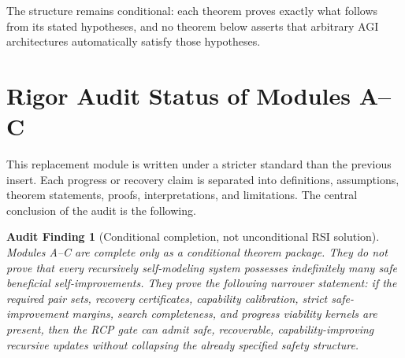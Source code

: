 \documentclass[11pt]{article}
\newcommand{\1}{\mathbf{1}}
\newtheorem{audit}[theorem]{Audit Finding}
\begin{document}
The structure remains conditional: each theorem proves exactly what follows from its stated hypotheses, and no theorem below asserts that arbitrary AGI architectures automatically satisfy those hypotheses.

\section{Rigor Audit Status of Modules A--C}
\label{sec:modules_A_C_audit_status}

This replacement module is written under a stricter standard than the previous insert.  Each progress or recovery claim is separated into definitions, assumptions, theorem statements, proofs, interpretations, and limitations.  The central conclusion of the audit is the following.

\begin{audit}[Conditional completion, not unconditional RSI solution]
Modules A--C are complete only as a conditional theorem package.  They do not prove that every recursively self-modeling system possesses indefinitely many safe beneficial self-improvements.  They prove the following narrower statement: if the required pair sets, recovery certificates, capability calibration, strict safe-improvement margins, search completeness, and progress viability kernels are present, then the RCP gate can admit safe, recoverable, capability-improving recursive updates without collapsing the already specified safety structure.
\end{audit}
\end{document}

